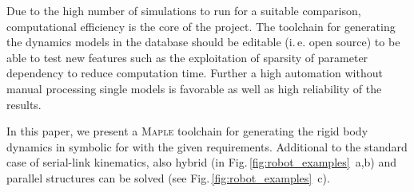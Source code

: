 \documentclass[runningheads]{llncs}
\begin{document}
Due to the high number of simulations to run for a suitable comparison, computational efficiency is the core of the project.
The toolchain for generating the dynamics models in the database should be editable (i.\,e. open source) to be able to test new features such as the exploitation of sparsity of parameter dependency to reduce computation time.
Further a high automation without manual processing single models is favorable as well as high reliability of the results.

In this paper, we present a \textsc{Maple} toolchain for generating the rigid body dynamics in symbolic for with the given requirements.
Additional to the standard case of serial-link kinematics, also hybrid (in Fig.\,\ref{fig:robot_examples}~a,b) and parallel structures can be solved (see Fig.\,\ref{fig:robot_examples}~c).
\end{document}

